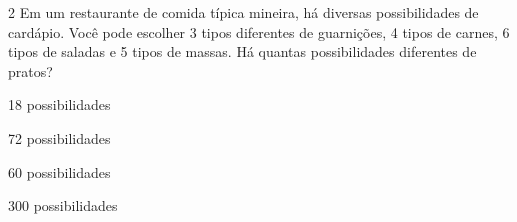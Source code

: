 {{{{%







\num{2} Em um restaurante de comida típica mineira, há diversas
possibilidades de cardápio. Você pode escolher 3 tipos diferentes de
guarnições, 4 tipos de carnes, 6 tipos de saladas e 5 tipos de massas.
Há quantas possibilidades diferentes de pratos?

\begin{escolha}[itemsep=0pt]
\item 18 possibilidades
\item 72 possibilidades
\item 60 possibilidades
\item 300 possibilidades
\end{escolha}






}}}}
